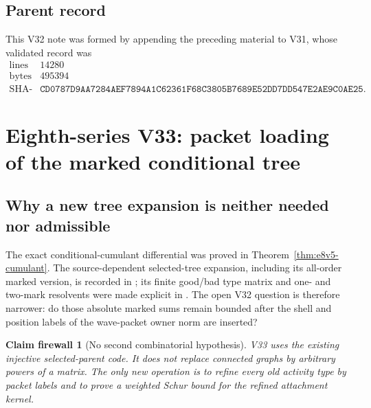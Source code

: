 \documentclass[11pt,oneside]{book}
\newtheorem{firewall}[theorem]{Claim firewall}
\theoremstyle{definition}
\theoremstyle{remark}
\begin{document}
\subsection{Parent record}

This V32 note was formed by appending the preceding material to V31,
whose validated record was
\[
\begin{array}{c|c}
\text{lines}&14280\\
\text{bytes}&495394\\
\text{SHA-256}&
\texttt{CD0787D9AA7284AEF7894A1C62361F68C3805B7689E52DD7DD547E2AE9C0AE25}.
\end{array}
\]



\section{Eighth-series V33: packet loading of the marked conditional
tree}

\subsection{Why a new tree expansion is neither needed nor admissible}

The exact conditional-cumulant differential was proved in
Theorem~\ref{thm:e8v5-cumulant}.  The source-dependent selected-tree
expansion, including its all-order marked version, is recorded in
; its finite good/bad type matrix and one- and
two-mark resolvents were made explicit in
.  The open V32 question is
therefore narrower: do those absolute marked sums remain bounded
after the shell and position labels of the wave-packet owner norm are
inserted?

\begin{firewall}[No second combinatorial hypothesis]
\label{fire:e8v33-no-new-tree}
V33 uses the existing injective selected-parent code.  It does not
replace connected graphs by arbitrary powers of a matrix.  The only
new operation is to refine every old activity type by packet labels
and to prove a weighted Schur bound for the refined attachment
kernel.
\end{firewall}
\end{document}
